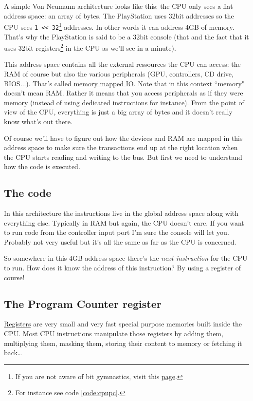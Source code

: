 \documentclass[a4paper]{article}
\newcommand{\code}[1] {\texttt{#1}}
\begin{document}
A simple Von Neumann architecture looks like this: the CPU only sees a
flat address space: an array of bytes. The PlayStation uses 32bit
addresses so the CPU sees \code{1 << 32}\footnote{If you are not aware of
  bit gymnastics, visit this \href{https://github.com/ravimohan1991/KarmaEngine/wiki/Bitwise-shift-operators}{page}.
} addresses. In other words it can address 4GB of memory. That's why the
PlayStation is said to be a 32bit console (that and the fact that it uses
32bit registers\footnote{ For instance see code \ref{code:cpupc}.} in
the CPU as we'll see in a minute).

This address space contains all the external ressources the CPU can
access: the RAM of course but also the various peripherals (GPU,
controllers, CD drive, BIOS...). That's called
\href{https://en.wikipedia.org/wiki/Memory-mapped_I/O}{memory mapped
  IO}. Note that in this context ``memory" doesn't mean RAM. Rather it
means that you access peripherals as if they were memory (instead of
using dedicated instructions for instance). From the point of view of
the CPU, everything is just a big array of bytes and it doesn't really
know what's out there.

Of course we'll have to figure out how the devices and RAM are mapped
in this address space to make sure the transactions end up at the
right location when the CPU starts reading and writing to the bus. But
first we need to understand how the code is executed.

\subsection{The code}

In this architecture the instructions live in the global address space
along with everything else. Typically in RAM but again, the CPU
doesn't care. If you want to run code from the controller input port
I'm sure the console will let you. Probably not very useful but it's
all the same as far as the CPU is concerned.

So somewhere in this 4GB address space there's the \emph{next instruction}
for the CPU to run. How does it know the address of this instruction?
By using a register of course!

\subsection{The Program Counter register}

\href{https://en.wikipedia.org/wiki/Processor_register}{Registers} are
very small and very fast special purpose memories built inside the
CPU. Most CPU instructions manipulate those registers by adding them,
multiplying them, masking them, storing their content to memory or
fetching it back\dots{}
\end{document}
